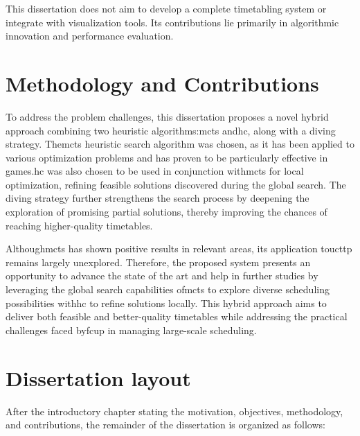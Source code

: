 This dissertation does not aim to develop a complete timetabling system or integrate with visualization tools. Its contributions lie primarily in algorithmic innovation and performance evaluation.


\section{Methodology and Contributions}

To address the problem challenges, this dissertation proposes a novel hybrid approach combining two heuristic algorithms:\ac{mcts} and\ac{hc}, along with a diving strategy. The\ac{mcts} heuristic search algorithm was chosen, as it has been applied to various optimization problems and has proven to be particularly effective in games.\ac{hc} was also chosen to be used in conjunction with\ac{mcts} for local optimization, refining feasible solutions discovered during the global search. The diving strategy further strengthens the search process by deepening the exploration of promising partial solutions, thereby improving the chances of reaching higher-quality timetables.

Although\ac{mcts} has shown positive results in relevant areas, its application to\ac{ucttp} remains largely unexplored. Therefore, the proposed system presents an opportunity to advance the state of the art and help in further studies by leveraging the global search capabilities of\ac{mcts} to explore diverse scheduling possibilities with\ac{hc} to refine solutions locally. This hybrid approach aims to deliver both feasible and better-quality timetables while addressing the practical challenges faced by\ac{fcup} in managing large-scale scheduling.

\section{Dissertation layout}

After the introductory chapter stating the motivation, objectives, methodology, and contributions, the remainder of the dissertation is organized as follows:

